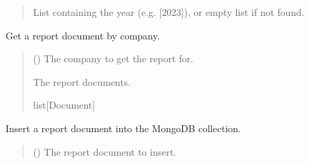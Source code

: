 \documentclass[letterpaper,10pt,english]{sphinxmanual}
\begin{document}
\begin{fulllineitems}
\begin{fulllineitems}
\begin{quote}
\begin{description}
\sphinxAtStartPar
List containing the year (e.g. {[}2023{]}), or empty list if not found.

\end{description}\end{quote}

\end{fulllineitems}


\begin{fulllineitems}
\label{\detokenize{src:src.db_utils.mongo.MongCollection.get_report_by_company}}
\pysigstartsignatures
{}
\pysigstopsignatures
\sphinxAtStartPar
Get a report document by company.
\begin{quote}\begin{description}
\sphinxAtStartPar
{} () \textendash{} The company to get the report for.

\sphinxAtStartPar
The report documents.

\sphinxAtStartPar
list{[}Document{]}

\end{description}\end{quote}

\end{fulllineitems}


\begin{fulllineitems}
\label{\detokenize{src:src.db_utils.mongo.MongCollection.insert_report}}
\pysigstartsignatures
{}
\pysigstopsignatures
\sphinxAtStartPar
Insert a report document into the MongoDB collection.
\begin{quote}\begin{description}
\sphinxAtStartPar
{} () \textendash{} The report document to insert.


\end{description}
\end{quote}
\end{fulllineitems}
\end{fulllineitems}
\end{document}
